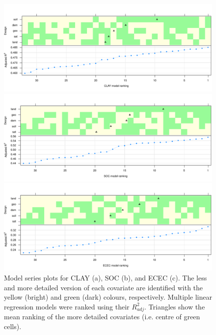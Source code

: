 \begin{figure}[!ht]
 \centering
 \begin{minipage}[b]{\textwidth}
  \subcaption{}
  \includegraphics[width=\textwidth]{fig/chap01FIG5a}
 \end{minipage}
 \begin{minipage}[b]{\textwidth}
  \subcaption{}
  \includegraphics[width=\textwidth]{fig/chap01FIG5b}
 \end{minipage}
 \begin{minipage}[b]{\textwidth}
  \subcaption{}
  \includegraphics[width=\textwidth]{fig/chap01FIG5c}
 \end{minipage}
 \caption{Model series plots for CLAY (a), SOC (b), and ECEC (c). The less and more detailed version of each 
 covariate are identified with the yellow (bright) and green (dark) colours, respectively. Multiple linear 
 regression models were ranked using their ${R}^{2}_{adj}$. Triangles show the mean ranking of the more 
 detailed covariates (i.e. centre of green cells).}
 \label{fig:chap05-model-series}
\end{figure}

